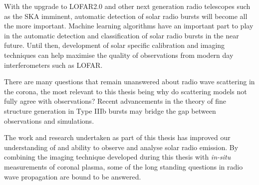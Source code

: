 With the upgrade to LOFAR2.0 and other next generation radio telescopes such as the SKA imminent, automatic detection of solar radio bursts will become all the more important. Machine learning algorithms have an important part to play in the automatic detection and classification of solar radio bursts in the near future. Until then, development of solar specific calibration and imaging techniques can help maximise the quality of observations from modern day interferometers such as LOFAR.  

There are many questions that remain unanswered about radio wave scattering in the corona, the most relevant to this thesis being why do scattering models not fully agree with observations? Recent advancements in the theory of fine structure generation in Type IIIb bursts may bridge the gap between observations and simulations.

The work and research undertaken as part of this thesis has improved our understanding of and ability to observe and analyse solar radio emission. By combining the imaging technique developed during this thesis with \textit{in-situ} measurements of coronal plasma, some of the long standing questions in radio wave propagation are bound to be answered. 














